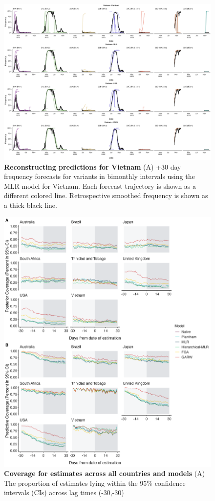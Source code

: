 \documentclass[11pt,oneside,letterpaper]{article}
\begin{document}
\begin{figure}[tb!]
	\centering
	\includegraphics[width=0.9\textwidth=0.01]{supp_figures/supplementary_fig_Vietnam.png}
	\caption{
		\textbf{Reconstructing predictions for Vietnam}
		(A) +30 day frequency forecasts for variants in bimonthly intervals using the MLR model for Vietnam.
		Each forecast trajectory is shown as a different colored line.
		Retrospective smoothed frequency is shown as a thick black line.
	}
	\label{fig:supplementary_fig_Vietnam}
\end{figure}


\begin{figure}[tb!]
	\centering
	\includegraphics[width=0.9\textwidth=0.01]{supp_figures/coverage_supp_2.png}
	\caption{
		\textbf{Coverage for estimates across all countries and models}
		(A) The proportion of estimates lying within the 95\% confidence intervals (CIs) across lag times (-30,-30)
	}
	\label{fig:coverage_supp_2}
\end{figure}
\end{document}
